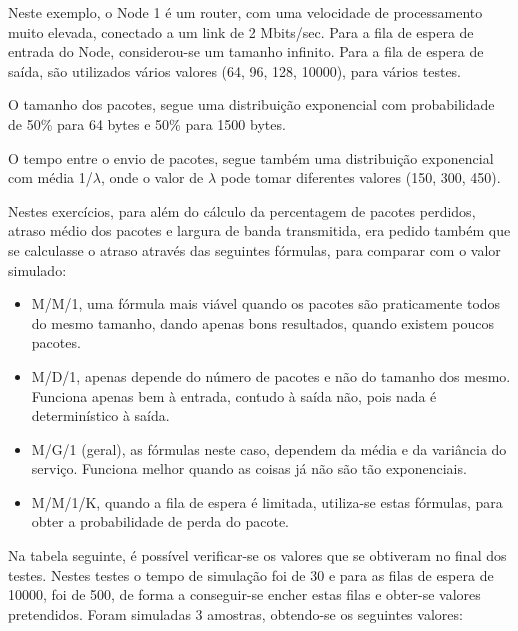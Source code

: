 \documentclass[pdftex,12pt,a4paper]{report}
\begin{document}
Neste exemplo, o Node 1 é um router, com uma velocidade de processamento muito elevada, conectado a um link de 2 Mbits/sec. Para a fila de espera de entrada do Node, considerou-se um tamanho infinito. Para a fila de espera de saída, são utilizados vários valores (64, 96, 128, 10000), para vários testes. 

O tamanho dos pacotes, segue uma distribuição exponencial com probabilidade de 50\% para 64 bytes e 50\% para 1500 bytes.

O tempo entre o envio de pacotes, segue também uma distribuição exponencial com média 1/$\lambda$, onde o valor de $\lambda$ pode tomar diferentes valores (150, 300, 450).

Nestes exercícios, para além do cálculo da percentagem de pacotes perdidos, atraso médio dos pacotes e largura de banda transmitida, era pedido também que se calculasse o atraso através das seguintes fórmulas, para comparar com o valor simulado:

\begin{itemize}
\item M/M/1, uma fórmula mais viável quando os pacotes são praticamente todos do mesmo tamanho, dando apenas bons resultados, quando existem poucos pacotes.
\item M/D/1, apenas depende do número de pacotes e não do tamanho dos mesmo. Funciona apenas bem à entrada, contudo à saída não, pois nada é determinístico à saída.
\item M/G/1 (geral), as fórmulas neste caso, dependem da média e da variância do serviço. Funciona melhor quando as coisas já não são tão exponenciais.
\item M/M/1/K, quando a fila de espera é limitada, utiliza-se estas fórmulas, para obter a probabilidade de perda do pacote.
\end{itemize}

Na tabela seguinte, é possível verificar-se os valores que se obtiveram no final dos testes. Nestes testes o tempo de simulação foi de 30 e para as filas de espera de 10000, foi de 500, de forma a conseguir-se encher estas filas e obter-se valores pretendidos. Foram simuladas 3 amostras, obtendo-se os seguintes valores:
\end{document}
